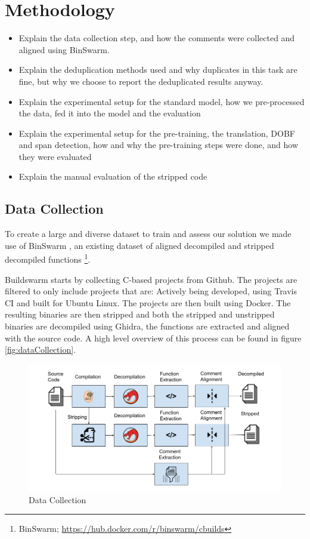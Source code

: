 \chapter{Methodology}
\label{methodology}
\begin{itemize}
    \item Explain the data collection step, and how the comments were collected and aligned using BinSwarm. 
    \item Explain the deduplication methods used and why duplicates in this task are fine, but why we choose to report the deduplicated results anyway.
    \item Explain the experimental setup for the standard model, how we pre-processed the data, fed it into the model and the evaluation 
    \item Explain the experimental setup for the pre-training, the translation, DOBF and span detection, how and why the pre-training steps were done, and how they were evaluated
    \item Explain the manual evaluation of the stripped code
\end{itemize}
\newpage

\section{Data Collection}
To create a large and diverse dataset to train and assess our solution we made use of BinSwarm \cite{InlinedFunc}, an existing dataset of aligned decompiled and stripped decompiled functions \footnote{BinSwarm; \url{https://hub.docker.com/r/binswarm/cbuilds}}.

Buildswarm starts by collecting C-based projects from Github. The projects are filtered to only include projects that are: Actively being developed, using Travis CI and built for Ubuntu Linux. The projects are then built using Docker. The resulting binaries are then stripped and both the stripped and unstripped binaries are decompiled using Ghidra, the functions are extracted and aligned with the source code. A high level overview of this process can be found in figure \ref{fig:dataCollection}.

\label{fig:dataCollection}
\begin{figure}[!h]
  \centering
  \includegraphics[width=\linewidth]{img/dataCollection.png}
  \caption{Data Collection}
\end{figure}

